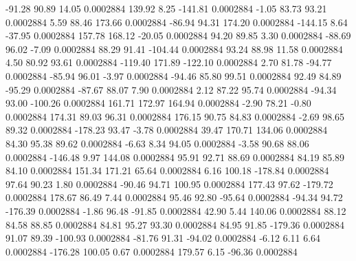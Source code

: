       -91.28       90.89       14.05     0.0002884
      139.92        8.25     -141.81     0.0002884
       -1.05       83.73       93.21     0.0002884
        5.59       88.46      173.66     0.0002884
      -86.94       94.31      174.20     0.0002884
     -144.15        8.64      -37.95     0.0002884
      157.78      168.12      -20.05     0.0002884
       94.20       89.85        3.30     0.0002884
      -88.69       96.02       -7.09     0.0002884
       88.29       91.41     -104.44     0.0002884
       93.24       88.98       11.58     0.0002884
        4.50       80.92       93.61     0.0002884
     -119.40      171.89     -122.10     0.0002884
        2.70       81.78      -94.77     0.0002884
      -85.94       96.01       -3.97     0.0002884
      -94.46       85.80       99.51     0.0002884
       92.49       84.89      -95.29     0.0002884
      -87.67       88.07        7.90     0.0002884
        2.12       87.22       95.74     0.0002884
      -94.34       93.00     -100.26     0.0002884
      161.71      172.97      164.94     0.0002884
       -2.90       78.21       -0.80     0.0002884
      174.31       89.03       96.31     0.0002884
      176.15       90.75       84.83     0.0002884
       -2.69       98.65       89.32     0.0002884
     -178.23       93.47       -3.78     0.0002884
       39.47      170.71      134.06     0.0002884
       84.30       95.38       89.62     0.0002884
       -6.63        8.34       94.05     0.0002884
       -3.58       90.68       88.06     0.0002884
     -146.48        9.97      144.08     0.0002884
       95.91       92.71       88.69     0.0002884
       84.19       85.89       84.10     0.0002884
      151.34      171.21       65.64     0.0002884
        6.16      100.18     -178.84     0.0002884
       97.64       90.23        1.80     0.0002884
      -90.46       94.71      100.95     0.0002884
      177.43       97.62     -179.72     0.0002884
      178.67       86.49        7.44     0.0002884
       95.46       92.80      -95.64     0.0002884
      -94.34       94.72     -176.39     0.0002884
       -1.86       96.48      -91.85     0.0002884
       42.90        5.44      140.06     0.0002884
       88.12       84.58       88.85     0.0002884
       84.81       95.27       93.30     0.0002884
       84.95       91.85     -179.36     0.0002884
       91.07       89.39     -100.93     0.0002884
      -81.76       91.31      -94.02     0.0002884
       -6.12        6.11        6.64     0.0002884
     -176.28      100.05        0.67     0.0002884
      179.57        6.15      -96.36     0.0002884
